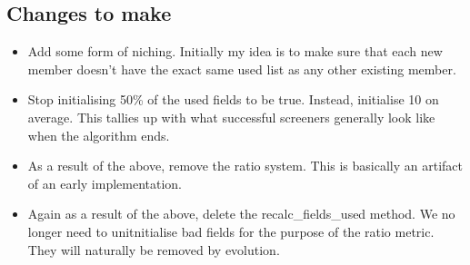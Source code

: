 \subsection{Changes to make}

\begin{itemize}
    \item Add some form of niching. Initially my idea is to make sure that each new member doesn't have the exact same used list as any other existing member.
    \item Stop initialising 50\% of the used fields to be true. Instead, initialise 10 on average. This tallies up with what successful screeners generally look like when the algorithm ends.
    \item As a result of the above, remove the ratio system. This is basically an artifact of an early implementation.
    \item Again as a result of the above, delete the recalc\_fields\_used method. We no longer need to unitnitialise bad fields for the purpose of the ratio metric. They will naturally be removed by evolution.
\end{itemize}